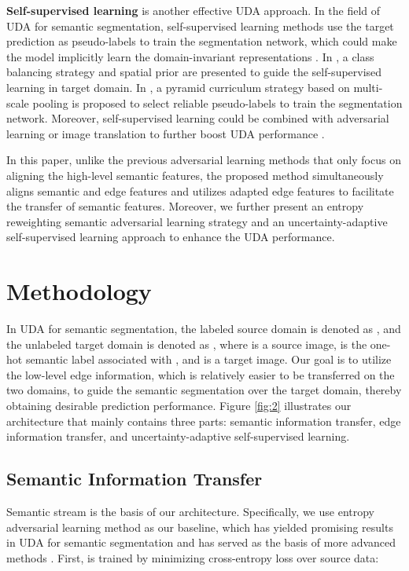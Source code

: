 \documentclass[sigconf]{acmart}
\begin{document}
\par \textbf{Self-supervised learning} is another effective UDA approach. In the field of UDA for semantic segmentation, self-supervised learning methods use the target prediction as pseudo-labels to train the segmentation network, which could make the model implicitly learn the domain-invariant representations \cite{zou2018unsupervised,yu2021dast}. In \cite{zou2018unsupervised}, a class balancing strategy and spatial prior are presented to guide the self-supervised learning in target domain. In \cite{lian2019constructing}, a pyramid curriculum strategy based on multi-scale pooling is proposed to select reliable pseudo-labels to train the segmentation network. Moreover, self-supervised learning could be combined with adversarial learning or image translation to further boost UDA performance \cite{yang2020fda,kim2020learning,pan2020unsupervised,yu2021dast}. 



\par In this paper, unlike the previous adversarial learning methods that only focus on aligning the high-level semantic features, the proposed method simultaneously aligns semantic and edge features and utilizes adapted edge features to facilitate the transfer of semantic features. Moreover, we further present an entropy reweighting semantic adversarial learning strategy and an uncertainty-adaptive self-supervised learning approach to enhance the UDA performance.








\section{Methodology}
\par In UDA for semantic segmentation, the labeled source domain is denoted as , and the unlabeled target domain is denoted as , where  is a source image,  is the one-hot semantic label associated with , and  is a target image. Our goal is to utilize the low-level edge information, which is relatively easier to be transferred on the two domains, to guide the semantic segmentation over the target domain, thereby obtaining desirable prediction performance. Figure \ref{fig:2} illustrates our architecture that mainly contains three parts: semantic information transfer, edge information transfer, and uncertainty-adaptive self-supervised learning.

\subsection{Semantic Information Transfer}
\par Semantic stream  is the basis of our architecture. Specifically, we use entropy adversarial learning method as our baseline, which has yielded promising results in UDA for semantic segmentation \cite{vu2019advent} and has served as the basis of more advanced methods \cite{vu2019dada,pan2020unsupervised}. First,  is trained by minimizing cross-entropy loss  over source data:
\end{document}
